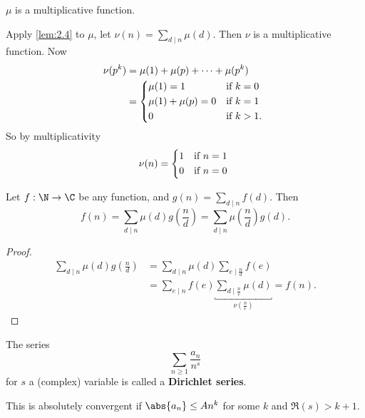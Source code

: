 \documentclass{article}
\begin{document}
\begin{ex}
    $\mu$ is a multiplicative function.
\end{ex}
Apply \cref{lem:2.4} to $\mu$, let $\nu(n) = \sum_{d \mid n} \mu(d)$.
Then $\nu$ is a multiplicative function.  Now
\begin{align*}
    \nu(p^k) &= \mu(1) + \mu(p) + \dotsb + \mu(p^k) \\
             &=
    \begin{cases*}
        \mu(1) = 1 & if $k=0$ \\
        \mu(1) + \mu(p) = 0 & if $k=1$ \\
        0 & if $k>1$.
    \end{cases*}
\end{align*}
So by multiplicativity
\begin{equation*}
    \nu(n) =
    \begin{cases*}
        1 & if $n = 1$ \\
        0 & if $n = 0$
    \end{cases*}
\end{equation*}

\begin{nprop}\label{prop:5.6}
    Let $f: \N \to \C$ be any function, and $g(n) = \sum_{d \mid n} f(d)$.
    Then
    \begin{equation*}
        f(n) = \sum_{d \mid n} \mu(d) g\!\left(\frac{n}{d}\right) = \sum_{d \mid n} \mu\!\left(\frac{n}{d}\right) g(d).
    \end{equation*}
\end{nprop}

\begin{proof}
    \begin{align*}
        \sum_{d \mid n} \mu(d) g\!\left(\frac{n}{d}\right) &= \sum_{d \mid n} \mu(d) \sum_{e \mid \frac{n}{d}} f(e) \\
                                              &= \sum_{e \mid n} f(e) \underbracket{\sum_{d \mid \frac{n}{e}} \mu(d)}_{\nu(\frac{n}{e})} = f(n).
    \end{align*}
\end{proof}

\begin{defi}
    The series
    \begin{equation*}
        \sum_{n \geq 1} \frac{a_n}{n^s}
    \end{equation*}
    for $s$ a (complex) variable is called a \textbf{Dirichlet series}.
\end{defi}
This is absolutely convergent if $\abs{a_n} \leq A n^k$ for some $k$ and $\Re(s) > k+1$.
\end{document}
